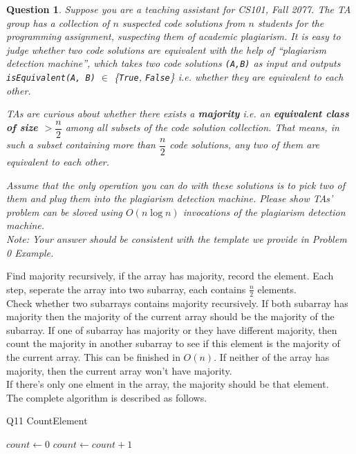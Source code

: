 \documentclass[10.5pt]{article}
\newtheorem{Q}{Question}
\begin{document}
\begin{Q}
Suppose you are a teaching assistant for CS101, Fall 2077. The TA group has a collection of $n$ suspected code solutions from $n$ students for the programming assignment, suspecting them of academic plagiarism. It is easy to judge whether two code solutions are equivalent with the help of ``plagiarism detection machine'', which takes two code solutions \texttt{(A,B)} as input and outputs \texttt{isEquivalent(A, B)} $\in$ \{\texttt{True}, \texttt{False}\} i.e. whether they are equivalent to each other.

TAs are curious about whether there exists a \textbf{majority} i.e. an \textbf{equivalent class of size $>\dfrac{n}{2}$} among all subsets of the code solution collection. That means, in such a subset containing more than $\dfrac{n}{2}$ code solutions, any two of them are equivalent to each other.

Assume that the only operation you can do with these solutions is to pick two of them and plug them into the plagiarism detection machine. Please show TAs' problem can be sloved using $O(n\log n)$ invocations of the plagiarism detection machine.\\

Note: Your answer should be consistent with the template we provide in Problem 0 Example.

\noindent
\end{Q}
Find majority recursively, if the array has majority, record the element.
Each step, seperate the array into two subarray, each contains $\frac n 2$ elements.\\
Check whether two subarrays contains majority recursively. If both subarray has majority then the majority of the current array should be the majority of the subarray. If one of subarray has majority or they have different majority, then count the majority in another subarray to see if this element is the majority of the current array. This can be finished in $O(n)$. If neither of the array has majority, then the current array won't have majority.\\
If there's only one elment in the array, the majority should be that element.\\
The complete algorithm is described as follows.\\
\begin{algorithm}[H]
	\caption{Q11 CountElement}
	\begin{algorithmic}[1]
			\State $count \gets 0$
					\State $count \gets count + 1$
				\EndIf
			\EndFor
		\EndFunction
	\end{algorithmic}
\end{algorithm}
\end{document}
